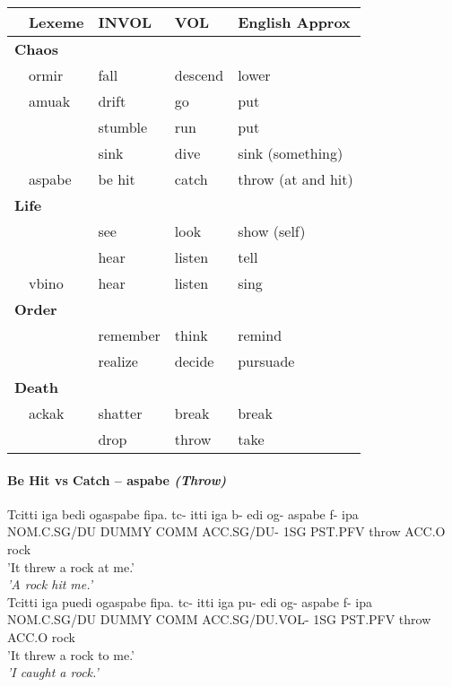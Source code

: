 \documentclass[12pt]{article}
\begin{document}
\begin{table}[H]
\begin{tabular}{ m{1em} m{5em} | m{5em} | m{5em}| m{10em} }
& Lexeme & INVOL & VOL & English Approx \\
\hline\hline
\multicolumn{5}{l}{ \textbf{Chaos} } \\
\hline
& ormir & fall & descend & lower \\ 
& amuak & drift & go & put \\ 
&       & stumble & run & put \\
&       & sink & dive & sink (something)\\ 

& aspabe & be hit & catch & throw (at and hit) \\ 

\hline
\multicolumn{4}{l}{ \textbf{Life} } \\
\hline
&        & see & look & show (self)\\ 
&       & hear & listen & tell\\ 
& vbino  & hear & listen & sing\\ 
       
\hline
\multicolumn{4}{l}{ \textbf{Order} } \\
\hline
&       & remember & think & remind \\ 
&       & realize & decide & pursuade\\ 
       
\hline
\multicolumn{4}{l}{ \textbf{Death} } \\
\hline
& ackak  & shatter & break & break \\
&       & drop & throw & take\\  

\end{tabular}
\end{table}

\paragraph{Be Hit vs Catch – aspabe \textit{(Throw)}}
\begin{exe}
\ex \label{fall}
\begin{xlist}
\ex \label{fall:invol}
Tcitti iga bedi ogaspabe fipa.
\gll
tc-         itti  iga  b-         edi og-     aspabe f-    ipa\\
NOM.C.SG/DU DUMMY COMM ACC.SG/DU- 1SG PST.PFV throw  ACC.O rock\\
\trans 
    {\textthin{}'It threw a rock at me.'}\\
    \textit{'A rock hit me.'}\\

\ex \label{fall:vol}
Tcitti iga puedi ogaspabe fipa.
\gll
tc-         itti  iga  pu-            edi og-     aspabe f-    ipa\\
NOM.C.SG/DU DUMMY COMM ACC.SG/DU.VOL- 1SG PST.PFV throw  ACC.O rock\\
\trans 
    {\textthin{}'It threw a rock to me.'}\\
    \textit{'I caught a rock.'}\\
\end{xlist}
\end{exe}
\end{document}
